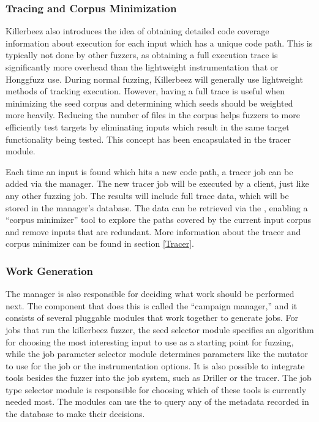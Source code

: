 \subsubsection{Tracing and Corpus Minimization} \label{Corpus Minimization}
Killerbeez also introduces the idea of obtaining detailed code coverage information about
execution for each input which has a unique code path.  This is typically
not done by other fuzzers, as obtaining a full execution trace is significantly more overhead than
the lightweight instrumentation that \AFL{} or Honggfuzz\cite{honggfuzz} use.\cite{collafl} During
normal fuzzing, Killerbeez will generally use lightweight methods of tracking
execution. However, having a full trace is useful when minimizing the seed corpus
and determining which seeds should be weighted more heavily. Reducing the
number of files in the corpus helps fuzzers to more efficiently test targets
by eliminating inputs which result in the same target functionality being
tested.\cite{fileformatfuzzing,softwaredumber} This concept has
been encapsulated in the tracer module.

Each time an input
is found which hits a new code path, a tracer job can be added via the manager.
The new tracer job will be executed by a \BOINC{} client, just like any other fuzzing job.
The results will include full trace data, which will be stored in the manager's
database.  The data can be retrieved via the \REST{} \API{}, enabling a ``corpus
minimizer'' tool to explore the paths covered by the current input corpus and
remove inputs that are redundant. More
information about the tracer and corpus minimizer can be found in section
\ref{Tracer}.

\subsubsection{Work Generation}
The manager is also responsible for deciding what work should be performed next.
The component that does this is called the ``campaign manager,'' and it consists
of several pluggable modules that work together to generate jobs. For
jobs that run the killerbeez fuzzer, the seed selector module specifies an
algorithm for choosing the most interesting input to use as a starting point for
fuzzing, while the job parameter selector module determines parameters like the
mutator to use for the job or the instrumentation options. It is also possible
to integrate tools besides the fuzzer into the job system, such as Driller or
the tracer. The job type selector module is responsible for choosing which of
these tools is currently needed most. The modules can use the \REST{} \API{} to
query any of the metadata recorded in the database to make their decisions.

